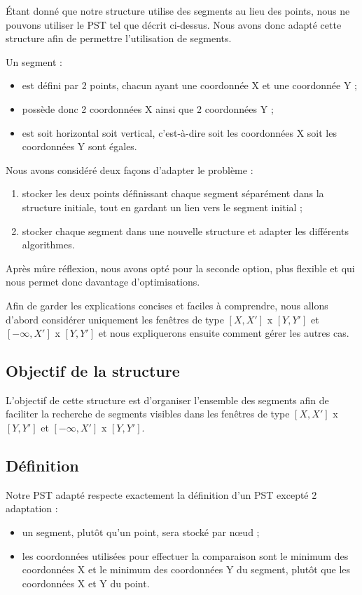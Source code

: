 \documentclass[10pt,a4paper]{article}
\begin{document}
Étant donné que notre structure utilise des segments au lieu des points, nous ne pouvons utiliser le PST tel que décrit ci-dessus. Nous avons donc adapté cette structure afin de permettre l'utilisation de segments.

Un segment :
\begin{itemize}
	\item est défini par 2 points, chacun ayant une coordonnée X et une coordonnée Y ;
	\item possède donc 2 coordonnées X ainsi que 2 coordonnées Y ;
	\item est soit horizontal soit vertical, c'est-à-dire soit les coordonnées X soit les coordonnées Y sont égales.
\end{itemize}

Nous avons considéré deux façons d'adapter le problème :
\begin{enumerate}
	\item stocker les deux points définissant chaque segment séparément dans la structure initiale, tout en gardant un lien vers le segment initial ;
	\item stocker chaque segment dans une nouvelle structure et adapter les différents algorithmes.
\end{enumerate}

Après mûre réflexion, nous avons opté pour la seconde option, plus flexible et qui nous permet donc davantage d'optimisations.

Afin de garder les explications concises et faciles à comprendre, nous allons d'abord considérer uniquement les fenêtres de type $[X, X']$ x $[Y, Y']$ et $[-\infty, X']$ x $[Y, Y']$ et nous expliquerons ensuite comment gérer les autres cas.

\subsection{Objectif de la structure}
L'objectif de cette structure est d'organiser l'ensemble des segments afin de faciliter la recherche de segments visibles dans les fenêtres de type $[X, X']$ x $[Y, Y']$ et $[-\infty, X']$ x $[Y, Y']$.

\subsection{Définition}
Notre PST adapté respecte exactement la définition d'un PST excepté 2 adaptation :
\begin{itemize}
	\item un segment, plutôt qu'un point, sera stocké par nœud ;
	\item les coordonnées utilisées pour effectuer la comparaison sont le minimum des coordonnées X et le minimum des coordonnées Y du segment, plutôt que les coordonnées X et Y du point.
\end{itemize}
\end{document}
